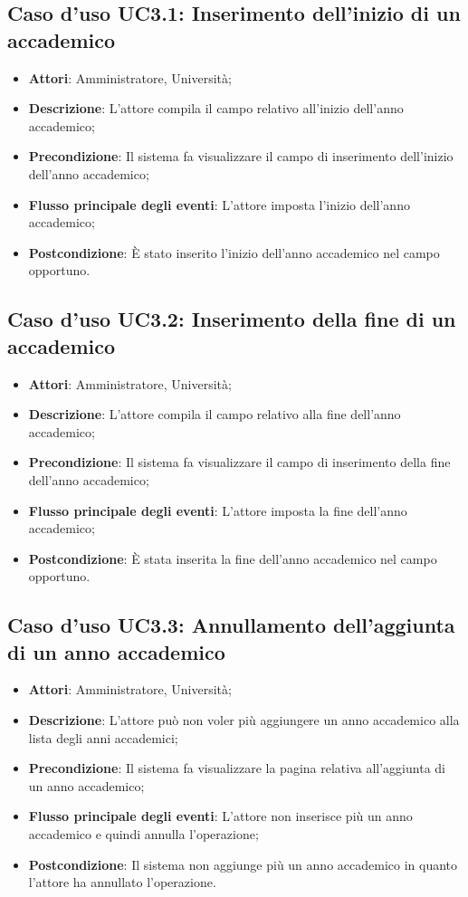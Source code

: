 \subsection{Caso d'uso \texorpdfstring{UC3.1}{UC3.1}: Inserimento dell'inizio di un accademico}
\begin{itemize}
	\item \textbf{Attori}: Amministratore, Università;
	\item \textbf{Descrizione}: L'attore compila il campo relativo all'inizio dell'anno accademico;
	\item \textbf{Precondizione}: Il sistema fa visualizzare il campo di inserimento dell'inizio dell'anno accademico;
	\item \textbf{Flusso principale degli eventi}: L'attore imposta l'inizio dell'anno accademico;
	\item \textbf{Postcondizione}: È stato inserito l'inizio dell'anno accademico nel campo opportuno.
\end{itemize}
\subsection{Caso d'uso \texorpdfstring{UC3.2}{UC3.2}: Inserimento della fine di un accademico}
\begin{itemize}
	\item \textbf{Attori}: Amministratore, Università;
	\item \textbf{Descrizione}: L'attore compila il campo relativo alla fine dell'anno accademico;
	\item \textbf{Precondizione}: Il sistema fa visualizzare il campo di inserimento della fine dell'anno accademico;
	\item \textbf{Flusso principale degli eventi}: L'attore imposta la fine dell'anno accademico;
	\item \textbf{Postcondizione}: È stata inserita la fine dell'anno accademico nel campo opportuno.
\end{itemize}
\subsection{Caso d'uso \texorpdfstring{UC3.3}{UC3.3}: Annullamento dell'aggiunta di un anno accademico}
\begin{itemize}
	\item \textbf{Attori}: Amministratore, Università;
	\item \textbf{Descrizione}: L'attore può non voler più aggiungere un anno accademico alla lista degli anni accademici;
	\item \textbf{Precondizione}: Il sistema fa visualizzare la pagina relativa all'aggiunta di un anno accademico;
	\item \textbf{Flusso principale degli eventi}: L'attore non inserisce più un anno accademico e quindi annulla l'operazione;
	\item \textbf{Postcondizione}: Il sistema non aggiunge più un anno accademico in quanto l'attore ha annullato l'operazione.
\end{itemize}
